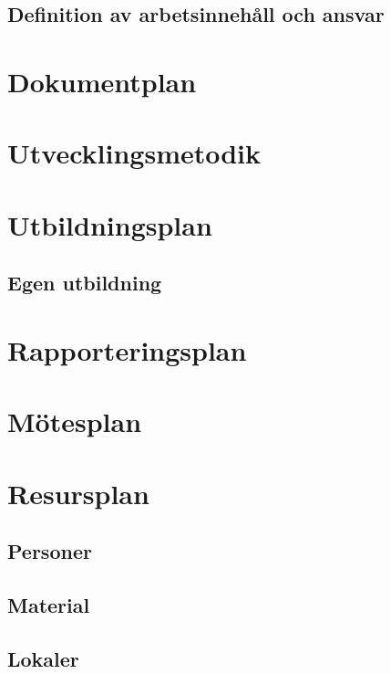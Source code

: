 \documentclass[11pt]{article}
\begin{document}
\begin{flushleft}
\subsection{Definition av arbetsinnehåll och ansvar}

\pagebreak

\section{Dokumentplan}

\pagebreak

\section{Utvecklingsmetodik}

\pagebreak

\section{Utbildningsplan}

\subsection{Egen utbildning}

\pagebreak

\section{Rapporteringsplan}

\pagebreak

\section{Mötesplan}

\pagebreak

\section{Resursplan}

\subsection{Personer}

\subsection{Material}

\subsection{Lokaler}


\end{flushleft}
\end{document}
